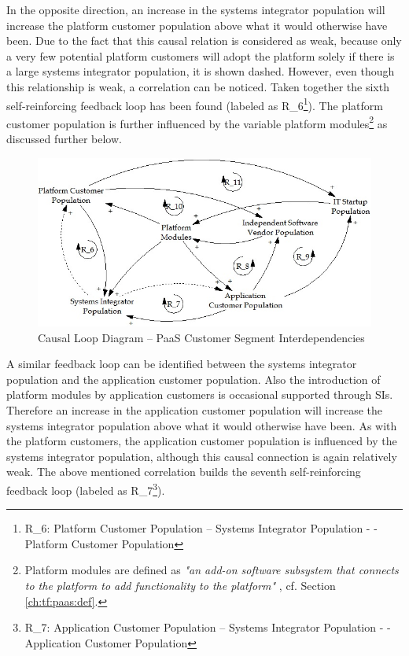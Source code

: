 In the opposite direction, an increase in the systems integrator population will increase the platform customer population above what it would otherwise have been. Due to the fact that this causal relation is considered as weak, because only a very few potential platform customers will adopt the platform solely if there is a large systems integrator population, it is shown dashed. However, even though this relationship is weak, a correlation can be noticed. Taken together the sixth self-reinforcing feedback loop has been found (labeled as R\_6\footnote{R\_6: Platform Customer Population -- Systems Integrator Population - - Platform Customer Population}). The platform customer population is further influenced by the variable platform modules\footnote{Platform modules are defined as \textit{"an add-on software subsystem that connects to the platform to add functionality to the platform"} \citep[p. 676]{Tiwana2010}, cf. Section \ref{ch:tf:paas:def}.} as discussed further below.

\begin{figure}[tb]
	\centering
	\includegraphics[width=\textwidth]{gfx/cld_customerSegmentInterdependencies}
	\caption{Causal Loop Diagram -- PaaS Customer Segment Interdependencies}
	\label{fig:cld_csi}
\end{figure}

A similar feedback loop can be identified between the systems integrator population and the application customer population. Also the introduction of platform modules by application customers is occasional supported through \acp{SI}. Therefore an increase in the application customer population will increase the systems integrator population above what it would otherwise have been. As with the platform customers, the application customer population is influenced by the systems integrator population, although this causal connection is again relatively weak. The above mentioned correlation builds the seventh self-reinforcing feedback loop (labeled as R\_7\footnote{R\_7: Application Customer Population -- Systems Integrator Population - - Application Customer Population}).

